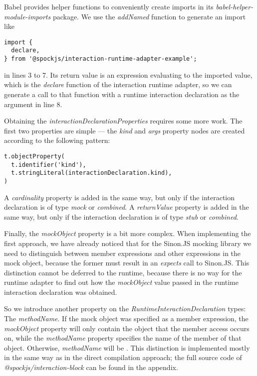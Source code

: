 Babel provides helper functions to conveniently create imports
in its \textit{babel-helper-module-imports} package.
We use the \textit{addNamed} function to generate an import like
\begin{verbatim}
import {
  declare,
} from '@spockjs/interaction-runtime-adapter-example';
\end{verbatim}
in lines 3 to 7.
Its return value is an expression evaluating to the imported value,
which is the \textit{declare} function of the interaction runtime adapter,
so we can generate a call to that function
with a runtime interaction declaration as the argument in line 8.

Obtaining the \textit{interactionDeclarationProperties} requires some more work.
The first two properties are simple ---
the \textit{kind} and \textit{args} property nodes
are created according to the following pattern:
\begin{verbatim}
t.objectProperty(
  t.identifier('kind'),
  t.stringLiteral(interactionDeclaration.kind),
)
\end{verbatim}
A \textit{cardinality} property is added in the same way,
but only if the interaction declaration
is of type \textit{mock} or \textit{combined}.
A \textit{returnValue} property is added in the same way,
but only if the interaction declaration
is of type \textit{stub} or \textit{combined}.

Finally, the \textit{mockObject} property is a bit more complex.
When implementing the first approach,
we have already noticed that for the Sinon.JS mocking library
we need to distinguish between member expressions
and other expressions in the mock object,
because the former must result in an \textit{expects} call to Sinon.JS.
This distinction cannot be deferred to the runtime,
because there is no way for the runtime adapter
to find out how the \textit{mockObject} value
passed in the runtime interaction declaration was obtained.

So we introduce another property
on the \textit{RuntimeInteractionDeclaration} types:
The \textit{methodName}.
If the mock object was specified as a member expression,
the \textit{mockObject} property will only contain
the object that the member access occurs on,
while the \textit{methodName} property specifies
the name of the member of that object.
Otherwise, \textit{methodName} will be .
This distinction is implemented mostly in the same way
as in the direct compilation approach;
the full source code of \textit{@spockjs/interaction-block}
can be found in the appendix.

